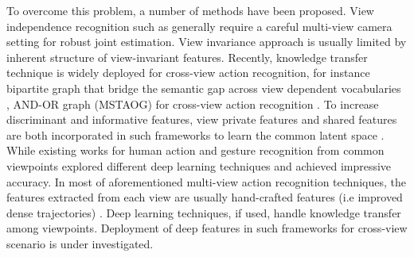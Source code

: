         To overcome this problem, a number of methods have been proposed. View independence recognition such as \cite{gavrila19963, lv2007single, weinland2007action} \cite{weinland2011survey} generally require a careful multi-view camera setting for robust joint estimation. View invariance approach \cite{junejo2008cross, li2012cross} is usually limited by inherent structure of view-invariant features. Recently, knowledge transfer technique is widely deployed for cross-view action recognition, for instance bipartite graph that bridge the semantic gap across view dependent vocabularies \cite{liu2011cross}, AND-OR graph (MSTAOG) for cross-view action recognition \cite{wang2014cross}. To increase discriminant and informative features, view private features and shared features are both incorporated in such frameworks to learn the common latent space \cite{kong2017deeply, liu2018hierarchically}. 
        While existing works for human action and gesture recognition from common viewpoints explored different deep learning techniques and achieved impressive accuracy. In most of aforementioned multi-view action recognition techniques, the features extracted from each view are usually hand-crafted features (i.e improved dense trajectories) \cite{rahmani2017learning, liu2018hierarchically,kong2017deeply}. Deep learning techniques, if used, handle knowledge transfer among viewpoints. Deployment of deep features in such frameworks for cross-view scenario is under investigated. 

